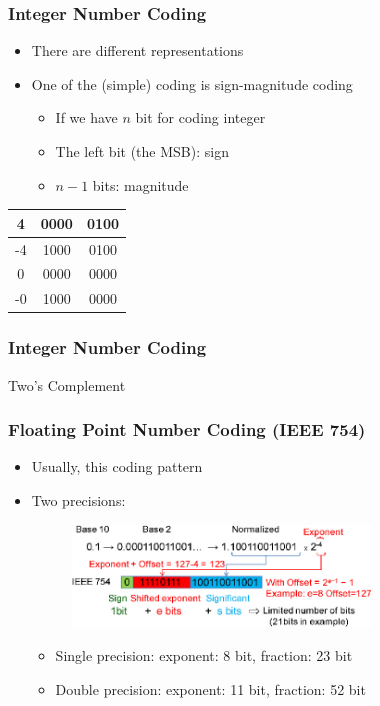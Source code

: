 \documentclass{../c-lecture}
\begin{document}
\begin{frame}
  \frametitle{Integer Number Coding}
  \begin{itemize}
    \item There are different representations
    \item One of the (simple) coding is sign-magnitude coding
    \begin{itemize}
      \item If we have $n$ bit for coding integer
      \item The left bit (the MSB): sign
      \item $n-1$ bits: magnitude
    \end{itemize}
  \end{itemize}
  \begin{table}
    \begin{tabular}{ccc}
      \toprule
      4 & 0000 & 0100 \\
      \midrule
      -4 & 1000 & 0100 \\
      \midrule
      0 & 0000 & 0000 \\
      \midrule
      -0 & 1000 & 0000 \\
      \bottomrule
    \end{tabular}
  \end{table}
\end{frame}

\begin{frame}
  \frametitle{Integer Number Coding}
  Two's Complement
\end{frame}

\begin{frame}
  \frametitle{Floating Point Number Coding (IEEE 754)}
  \begin{itemize}
    \item Usually, this coding pattern
    \item Two precisions:
    \begin{figure}
      \includegraphics[width=0.75\textwidth]{./img/ieee-754.png}
    \end{figure}
    \begin{itemize}
      \item Single precision: exponent: 8 bit, fraction: 23 bit
      \item Double precision: exponent: 11 bit, fraction: 52 bit
    \end{itemize}
  \end{itemize}
\end{frame}
\end{document}
